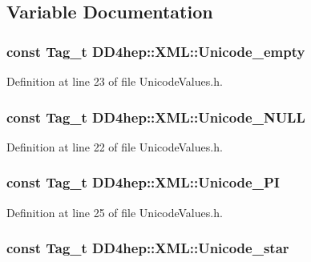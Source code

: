 \subsection{Variable Documentation}
\hypertarget{namespace_d_d4hep_1_1_x_m_l_a7a7724cea3f11674936836cef5c23ab7}{
\subsubsection[{Unicode\_\-empty}]{\setlength{\rightskip}{0pt plus 5cm}const {\bf Tag\_\-t} {\bf DD4hep::XML::Unicode\_\-empty}}}
\label{namespace_d_d4hep_1_1_x_m_l_a7a7724cea3f11674936836cef5c23ab7}


Definition at line 23 of file UnicodeValues.h.\hypertarget{namespace_d_d4hep_1_1_x_m_l_acab6de83f9ff0b5c2b13d8c1494bc764}{
\subsubsection[{Unicode\_\-NULL}]{\setlength{\rightskip}{0pt plus 5cm}const {\bf Tag\_\-t} {\bf DD4hep::XML::Unicode\_\-NULL}}}
\label{namespace_d_d4hep_1_1_x_m_l_acab6de83f9ff0b5c2b13d8c1494bc764}


Definition at line 22 of file UnicodeValues.h.\hypertarget{namespace_d_d4hep_1_1_x_m_l_a7511a1d6521bfeef1fd1c23876d8784a}{
\subsubsection[{Unicode\_\-PI}]{\setlength{\rightskip}{0pt plus 5cm}const {\bf Tag\_\-t} {\bf DD4hep::XML::Unicode\_\-PI}}}
\label{namespace_d_d4hep_1_1_x_m_l_a7511a1d6521bfeef1fd1c23876d8784a}


Definition at line 25 of file UnicodeValues.h.\hypertarget{namespace_d_d4hep_1_1_x_m_l_a495000b41f1aa8457f053c7da28f3599}{
\subsubsection[{Unicode\_\-star}]{\setlength{\rightskip}{0pt plus 5cm}const {\bf Tag\_\-t} {\bf DD4hep::XML::Unicode\_\-star}}}
\label{namespace_d_d4hep_1_1_x_m_l_a495000b41f1aa8457f053c7da28f3599}


